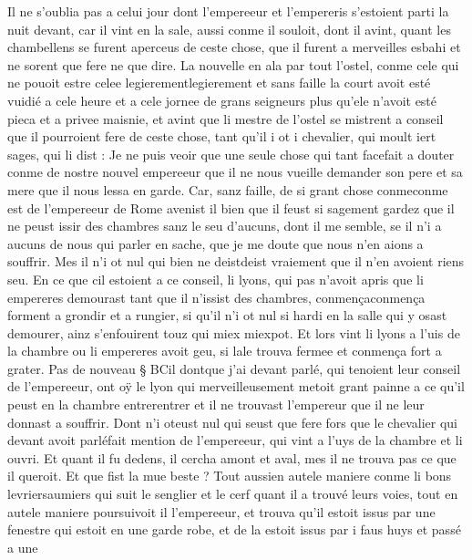 \documentclass{article}
\begin{document}
\begin{pages}
   Il ne s’oublia pas a celui jour dont l’empereeur et l’empereris 
   s’estoient parti la nuit devant, car il vint en la sale, aussi conme il souloit, dont il avint, quant les chambellens se furent aperceus 
   de ceste chose, que il furent a merveilles esbahi et ne sorent que fere ne que dire. La nouvelle en ala par tout l’ostel, 
   conme cele qui ne pouoit estre celee legierementlegierement et sans faille la court avoit esté
   vuidié a cele heure et a cele jornee de grans seigneurs plus qu'ele n'avoit esté pieca et a privee maisnie,
   et avint que li mestre de l’ostel se mistrent a conseil que il pourroient fere de ceste chose, tant qu’il i ot i 
   chevalier, qui moult iert sages, 
   qui li dist :
   Je ne puis veoir que une seule chose qui tant 
      facefait a douter conme de 
      nostre nouvel empereeur que il ne nous vueille demander 
      son pere et sa mere que il nous lessa en garde.
      Car, sanz faille, de si grant chose conmeconme est de l’empereeur de 
      Rome avenist il bien que il feust si sagement gardez que il ne peust issir des chambres sanz le seu 
      d’aucuns, dont il me semble, se il n’i a aucuns de nous qui parler en sache, que je me doute que nous n’en aions a souffrir.
   Mes il n’i ot nul qui bien ne deistdeist vraiement que 
   il n’en avoient riens seu. \pend
\pstart En ce que cil estoient a ce conseil, li lyons, 
   qui pas n’avoit apris que li empereres demourast tant que il n’issist des chambres,
   conmençaconmença forment a grondir et a rungier, si qu’il n’i ot nul si hardi en la salle 
   qui y osast demourer, ainz s’enfouirent touz qui miex miexpot. 
   Et lors vint li lyons a l’uis de la chambre ou 
   li empereres avoit geu, si lale trouva 
   fermee et conmença fort a grater. \pend
\pstart Pas de nouveau § BCil 
   dontque j’ai devant parlé, 
   qui tenoient leur conseil de l’empereeur, ont oÿ 
   le lyon qui merveilleusement metoit grant painne a ce qu’il peust en la chambre 
   entrerentrer et il ne trouvast l'empereur que il ne leur donnast a souffrir.
   Dont n’i oteust nul qui seust que fere fors que 
   le chevalier qui devant avoit
      parléfait mention de 
   l’empereeur, qui vint a l’uys de la chambre et li ouvri. Et quant il fu dedens, il cercha amont 
   et aval, mes il ne trouva pas ce que il queroit. Et que fist la mue beste ? 
   Tout aussien autele maniere conme li bons 
   levriersaumiers 
   qui suit le senglier et le cerf quant il a trouvé leurs voies, tout en autele maniere 
   poursuivoit il l’empereeur, et trouva qu’il estoit issus par une fenestre 
   qui estoit en une garde robe, et de la estoit issus par i faus huys et passé a une 

\end{pages}
\end{document}
